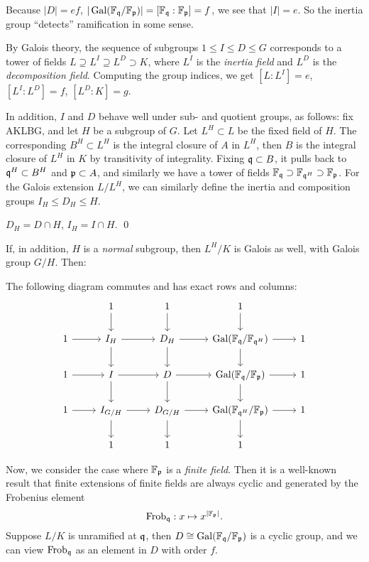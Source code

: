\documentclass[11pt]{amsart}
\begin{document}
Because $|D| = ef$, $|\operatorname{Gal}(\mathbb{F}_{\mathfrak{q}}/\mathbb{F}_{\mathfrak{p}})| = [\mathbb{F}_{\mathfrak{q}}:\mathbb{F}_{\mathfrak{p}}] = f$, we see that $|I| = e$. So the inertia group ``detects'' ramification in some sense.

By Galois theory, the sequence of subgroups $1 \le I \le D \le G$ corresponds to a tower of fields $L \supseteq L^I \supseteq L^D \supset K$, where $L^I$ is the \emph{inertia field} and $L^D$ is the \emph{decomposition field}. Computing the group indices, we get $[L:L^I] = e$, $[L^I:L^D] = f$, $[L^D:K] = g$.

In addition, $I$ and $D$ behave well under sub- and quotient groups, as follows: fix AKLBG, and let $H$ be a subgroup of $G$. Let $L^H\subset L$ be the fixed field of $H$. The corresponding $B^H\subset L^H$ is the integral closure of $A$ in $L^H$, then $B$ is the integral closure of $L^H$ in $K$ by transitivity of integrality. Fixing $\mathfrak{q}\subset B$, it pulls back to $\mathfrak{q}^H\subset B^H$ and $\mathfrak{p} \subset A$, and similarly we have a tower of fields $\mathbb{F}_{\mathfrak{q}} \supset \mathbb{F}_{\mathfrak{q}^H} \supset \mathbb{F}_{\mathfrak{p}}$. For the Galois extension $L/L^H$, we can similarly define the inertia and composition groups $I_H\le D_H \le H$.

\begin{prop}
$D_H = D\cap H$, $I_H = I\cap H$. \qed
\end{prop}

If, in addition, $H$ is a \emph{normal} subgroup, then $L^H/K$ is Galois as well, with Galois group $G/H$. Then:

\begin{prop}
The following diagram commutes and has exact rows and columns:
\[
\begin{tikzcd}
 & 1 \arrow[d] & 1 \arrow[d] & 1\arrow[d] & \\
1 \arrow[r] & I_H \arrow[d] \arrow[r] & D_H \arrow[d] \arrow[r] & \Gal(\FF_{\fq}/\FF_{\fq^H}) \arrow[d] \arrow[r] & 1 \\
1 \arrow[r] & I \arrow[d] \arrow[r] & D \arrow[d] \arrow[r] & \Gal(\FF_{\fq}/\FF_{\fp}) \arrow[d] \arrow[r] & 1 \\
1 \arrow[r] & I_{G/H} \arrow[d] \arrow[r] & D_{G/H} \arrow[d] \arrow[r] & \Gal(\FF_{\fq^H}/\FF_{\fp}) \arrow[d] \arrow[r] & 1 \\
& 1 & 1 & 1 &
\end{tikzcd}
\]
\end{prop}

Now, we consider the case where $\mathbb{F}_{\mathfrak{p}}$ is a \emph{finite field}. Then it is a well-known result that finite extensions of finite fields are always cyclic and generated by the Frobenius element
\[\operatorname{Frob}_{\mathfrak{q}}: x\mapsto x^{|\mathbb{F}_{\mathfrak{p}}|}.\]
Suppose $L/K$ is unramified at $\mathfrak{q}$, then $D \cong \operatorname{Gal}(\mathbb{F}_{\mathfrak{q}}/\mathbb{F}_{\mathfrak{p}})$ is a cyclic group, and we can view $\operatorname{Frob}_{\mathfrak{q}}$ as an element in $D$ with order $f$.
\end{document}

